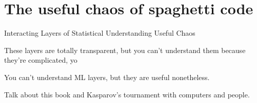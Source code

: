 \setchapterpreamble[u]{\margintoc}
\chapter{The useful chaos of spaghetti code}

Interacting Layers of Statistical Understanding
Useful Chaos

These layers are totally transparent, but you can't understand them because they're complicated, yo

You can't understand ML layers, but they are useful nonetheless.

Talk about this book and Kasparov's tournament with computers and people. 
